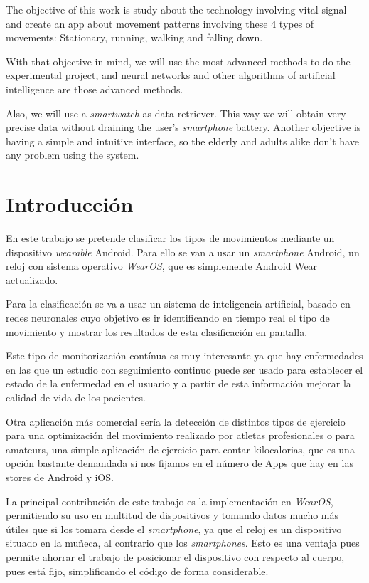 \documentclass[12pt]{book}
\numberwithin{equation}{section}
\begin{document}
The objective of this work is study about the technology involving vital signal and create an app about movement patterns involving these 4 types of movements: Stationary, running, walking and falling down.

With that objective in mind, we will use the most advanced methods to do the experimental project, and neural networks and other algorithms of artificial intelligence are those advanced methods.

Also, we will use a \textit{smartwatch} as data retriever. This way we will obtain very precise data without draining the user's \textit{smartphone} battery. Another objective is having a simple and intuitive interface, so the elderly and adults alike don't have any problem using the system.

\newpage
\chapter{Introducción}

En este trabajo se pretende clasificar los tipos de movimientos mediante un dispositivo \textit{wearable} Android. Para ello se van a usar un \textit{smartphone} Android, un reloj con sistema operativo \textit{WearOS}, que es simplemente Android Wear actualizado.

Para la clasificación se va a usar un sistema de inteligencia artificial, basado en redes neuronales cuyo objetivo es ir identificando en tiempo real el tipo de movimiento y mostrar los resultados de esta clasificación en pantalla.

Este tipo de monitorización contínua es muy interesante ya que hay enfermedades en las que un estudio con seguimiento continuo puede ser usado para establecer el estado de la enfermedad en el usuario y a partir de esta información mejorar la calidad de vida de los pacientes.

Otra aplicación más comercial sería la detección de distintos tipos de ejercicio para una optimización del movimiento realizado por atletas profesionales o para amateurs, una simple aplicación de ejercicio para contar kilocalorias, que es una opción bastante demandada si nos fijamos en el número de Apps que hay en las stores de Android y iOS.

La principal contribución de este trabajo es la implementación en \textit{WearOS}, permitiendo su uso en multitud de dispositivos y tomando datos mucho más útiles que si los tomara desde el \textit{smartphone}, ya que el reloj es un dispositivo situado en la muñeca, al contrario que los \textit{smartphones}. Esto es una ventaja pues permite ahorrar el trabajo de posicionar el dispositivo con respecto al cuerpo, pues está fijo, simplificando el código de forma considerable.
\end{document}
